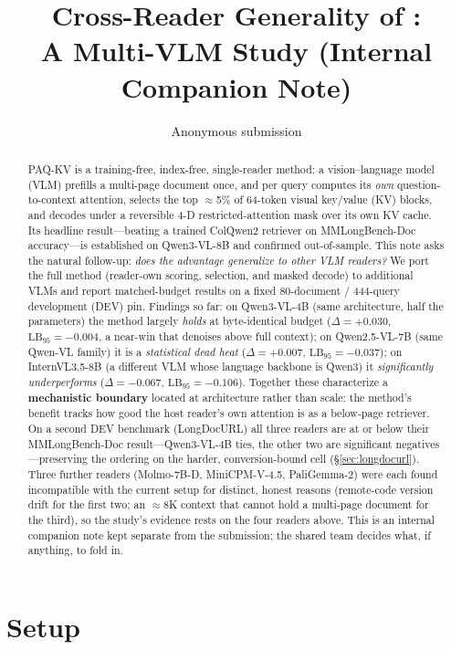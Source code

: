 \documentclass[letterpaper]{article} %
\title{Cross-Reader Generality of \paqc{}:\\A Multi-VLM Study (Internal Companion Note)}
\author{Anonymous submission}
\newcommand{\paqc}{\textsc{PAQ-KV}}
\newcommand{\lb}{\mathrm{LB}_{95}}
\begin{document}
\maketitle

\begin{abstract}
\noindent
\paqc{} is a training-free, index-free, single-reader method: a vision--language model (VLM) prefills a multi-page
document once, and per query computes its \emph{own} question-to-context attention, selects the top $\approx$5\% of
64-token visual key/value (KV) blocks, and decodes under a reversible 4-D restricted-attention mask over its own KV
cache. Its headline result---beating a trained ColQwen2 retriever on MMLongBench-Doc accuracy---is established on
Qwen3-VL-8B and confirmed out-of-sample. This note asks the natural follow-up: \emph{does the advantage generalize to
other VLM readers?} We port the full method (reader-own scoring, selection, and masked decode) to additional VLMs and
report matched-budget results on a fixed 80-document / 444-query development (DEV) pin. Findings so far: on
Qwen3-VL-4B (same architecture, half the parameters) the method largely \emph{holds} at byte-identical budget
($\Delta=+0.030$, $\lb=-0.004$, a near-win that denoises above full context); on Qwen2.5-VL-7B (same Qwen-VL family) it
is a \emph{statistical dead heat} ($\Delta=+0.007$, $\lb=-0.037$); on InternVL3.5-8B (a different VLM whose language
backbone is Qwen3) it \emph{significantly underperforms} ($\Delta=-0.067$, $\lb=-0.106$). Together these characterize a
\textbf{mechanistic boundary} located at architecture rather than scale: the method's benefit tracks how good the host
reader's own attention is as a below-page retriever. On a second DEV benchmark (LongDocURL) all three readers are at
or below their MMLongBench-Doc result---Qwen3-VL-4B ties, the other two are significant negatives---preserving the
ordering on the harder, conversion-bound cell (\S\ref{sec:longdocurl}). Three further readers (Molmo-7B-D,
MiniCPM-V-4.5, PaliGemma-2)
were each found incompatible with the current setup for distinct, honest reasons (remote-code version drift for the
first two; an $\approx$8K context that cannot hold a multi-page document for the third), so the study's evidence rests
on the four readers above. This is an internal companion note kept separate from the submission; the shared team
decides what, if anything, to fold in.
\end{abstract}

\section{Setup}
\label{sec:setup}
\end{document}
